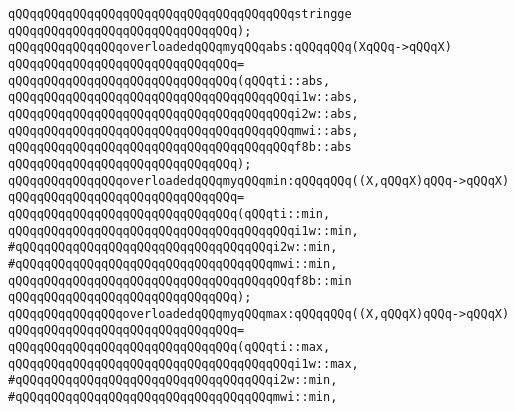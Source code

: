 \verb|qQQqqQQqqQQqqQQqqQQqqQQqqQQqqQQqqQQqqQQqstringge|\newline
\verb|qQQqqQQqqQQqqQQqqQQqqQQqqQQqqQQq);|\newline
\newline
\verb|qQQqqQQqqQQqqQQqoverloadedqQQqmyqQQqabs:qQQqqQQq(XqQQq->qQQqX)|\newline
\verb|qQQqqQQqqQQqqQQqqQQqqQQqqQQqqQQq=|\newline
\verb|qQQqqQQqqQQqqQQqqQQqqQQqqQQqqQQq(qQQqti::abs,|\newline
\verb|qQQqqQQqqQQqqQQqqQQqqQQqqQQqqQQqqQQqqQQqi1w::abs,|\newline
\verb|qQQqqQQqqQQqqQQqqQQqqQQqqQQqqQQqqQQqqQQqi2w::abs,|\newline
\verb|qQQqqQQqqQQqqQQqqQQqqQQqqQQqqQQqqQQqqQQqmwi::abs,|\newline
\verb|qQQqqQQqqQQqqQQqqQQqqQQqqQQqqQQqqQQqqQQqf8b::abs|\newline
\verb|qQQqqQQqqQQqqQQqqQQqqQQqqQQqqQQq);|\newline
\newline
\verb|qQQqqQQqqQQqqQQqoverloadedqQQqmyqQQqmin:qQQqqQQq((X,qQQqX)qQQq->qQQqX)|\newline
\verb|qQQqqQQqqQQqqQQqqQQqqQQqqQQqqQQq=|\newline
\verb|qQQqqQQqqQQqqQQqqQQqqQQqqQQqqQQq(qQQqti::min,|\newline
\verb|qQQqqQQqqQQqqQQqqQQqqQQqqQQqqQQqqQQqqQQqi1w::min,|\newline
\verb|#qQQqqQQqqQQqqQQqqQQqqQQqqQQqqQQqqQQqi2w::min,|\newline
\verb|#qQQqqQQqqQQqqQQqqQQqqQQqqQQqqQQqqQQqmwi::min,|\newline
\verb|qQQqqQQqqQQqqQQqqQQqqQQqqQQqqQQqqQQqqQQqf8b::min|\newline
\verb|qQQqqQQqqQQqqQQqqQQqqQQqqQQqqQQq);|\newline
\newline
\verb|qQQqqQQqqQQqqQQqoverloadedqQQqmyqQQqmax:qQQqqQQq((X,qQQqX)qQQq->qQQqX)|\newline
\verb|qQQqqQQqqQQqqQQqqQQqqQQqqQQqqQQq=|\newline
\verb|qQQqqQQqqQQqqQQqqQQqqQQqqQQqqQQq(qQQqti::max,|\newline
\verb|qQQqqQQqqQQqqQQqqQQqqQQqqQQqqQQqqQQqqQQqi1w::max,|\newline
\verb|#qQQqqQQqqQQqqQQqqQQqqQQqqQQqqQQqqQQqi2w::min,|\newline
\verb|#qQQqqQQqqQQqqQQqqQQqqQQqqQQqqQQqqQQqmwi::min,|\newline
